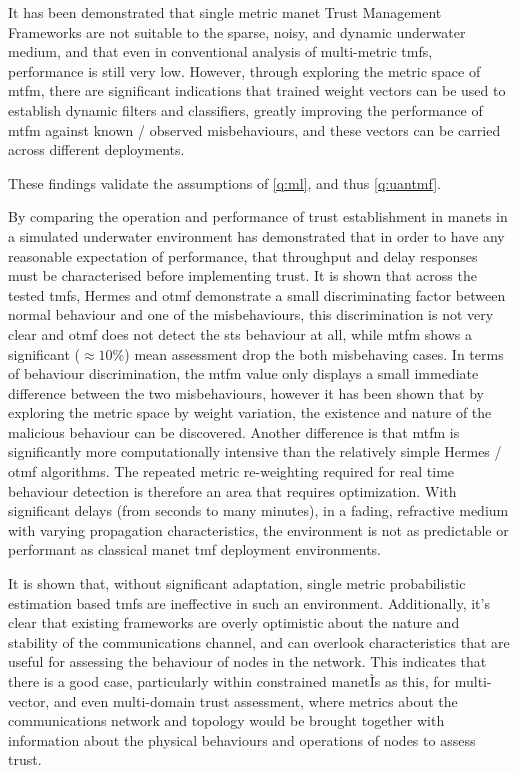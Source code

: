 It has been demonstrated that single metric \gls{manet} Trust Management Frameworks are not suitable to the sparse, noisy, and dynamic underwater medium, and that even in conventional analysis of multi-metric \glspl{tmf}, performance is still very low.
However, through exploring the metric space of \gls{mtfm}, there are significant indications that trained weight vectors can be used to establish dynamic filters and classifiers, greatly improving the performance of \gls{mtfm} against known / observed misbehaviours, and these vectors can be carried across different deployments. 

These findings validate the assumptions of \autoref{q:ml}, and thus \autoref{q:uantmf}.
 
By comparing the operation and performance of trust establishment in \glspl{manet} in a simulated underwater environment has demonstrated that in order to have any reasonable expectation of performance, that throughput and delay responses must be characterised before implementing trust. 
It is shown that across the tested \glspl{tmf}, Hermes and \gls{otmf} demonstrate a small discriminating factor between normal behaviour and one of the misbehaviours, this discrimination is not very clear and \gls{otmf} does not detect the \gls{sts} behaviour at all, while \gls{mtfm} shows a significant ($\approx 10\%$) mean assessment drop the both misbehaving cases. 
In terms of behaviour discrimination, the \gls{mtfm} value only displays a small immediate difference between the two misbehaviours, however it has been shown that by exploring the metric space by weight variation, the existence and nature of the malicious behaviour can be discovered.
Another difference is that \gls{mtfm} is significantly more computationally intensive than the relatively simple Hermes / \gls{otmf} algorithms.
The repeated metric re-weighting required for real time behaviour detection is therefore an area that requires optimization.
With significant delays (from seconds to many minutes), in a fading, refractive medium with varying propagation characteristics, the environment is not as predictable or performant as classical \gls{manet} \gls{tmf} deployment environments.

It is shown that, without significant adaptation, single metric probabilistic estimation based \glspl{tmf} are ineffective in such an environment.
Additionally, it's clear that existing frameworks are overly optimistic about the nature and stability of the communications channel, and can overlook characteristics that are useful for assessing the behaviour of nodes in the network. 
This indicates that there is a good case, particularly within constrained \gls{manet}Ìs as this, for multi-vector, and even multi-domain trust assessment, where metrics about the communications network and topology would be brought together with information about the physical behaviours and operations of nodes to assess trust.

